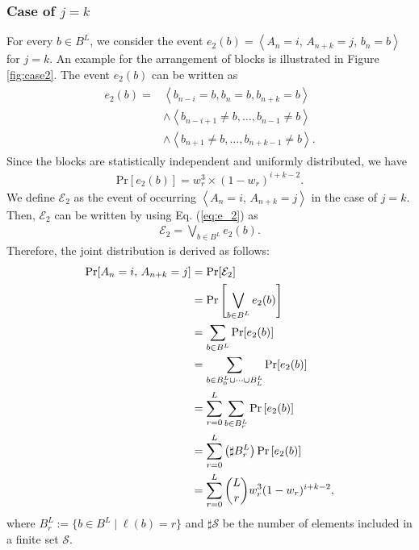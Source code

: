 \documentclass[dvipdfmx,english]{ampmt} %
\begin{document}
\subsubsection{Case of $j=k$}
For every $b \in B^{L}$, we consider the event $e_2(b)=\left< A_n=i ,\, A_{n+k}=j,\,b_n=b\right>$ for $j=k$. 
An example for the arrangement of blocks is illustrated in Figure \ref{fig:case2}.
The event $e_2(b)$ can be written as
\begin{align}\label{eq:e_2}
\begin{split}
  e_2(b) 
    = &\left< b_{n-i} = b , b_{n} = b, b_{n+k} = b \right> \\
    &\land \left< b_{n-i+1} \neq b , \dots , b_{n-1} \neq b \right> \\
    &\land \left< b_{n+1} \neq b , \dots , b_{n+k-1} \neq b \right>.
\end{split}
\end{align}
Since the blocks are statistically independent and uniformly distributed, we have
\begin{align}\label{eq:probability_e_2}
  \mathrm{Pr} \left[ e_2(b) \right] 
  =w_r^3 \times (1-w_{r})^{i+k-2}.
\end{align}
%
We define $\mathcal{E}_2$ as the event of occurring $\left< A_n=i ,\, A_{n+k}=j\right>$ in the case of $j=k$. Then, $\mathcal{E}_2$ can be written by using Eq. (\ref{eq:e_2}) as
\begin{align}\label{eq:E_2}
  \mathcal{E}_2 = \bigvee_{b\in B^L} e_2(b).
\end{align}
%
Therefore, the joint distribution is derived as follows:
\begin{align}
\begin{split}\label{eq:joint_dist_2}
  \mathrm{Pr}[A_n=i ,\, A_{n+k}=j] &=
  \mathrm{Pr}[\mathcal{E}_2] \\
  &=\mathrm{Pr}\left[ \bigvee_{b \in B^L} e_2(b) \right] \\
  &= \sum_{b\in B^L} \mathrm{Pr} [e_2(b)] \\
  &= \sum_{b\in B_0^L \cup \dots \cup B_L^L} \mathrm{Pr} [e_2(b)] \\
  &= \sum_{r=0}^{L} \sum_{b\in B_{r}^L} \mathrm{Pr} \left[ e_2(b) \right] \\
  &= \sum_{r=0}^{L} \left(\sharp B_{r}^L \right) \mathrm{Pr} \left[ e_2(b) \right] \\
  &= \sum_{r=0}^{L} \dbinom{L}{r} w_{r}^3 (1-w_{r})^{i+k-2},
\end{split}
\end{align}
where $B_r^L := \{ b\in B^L \mid \ell(b)=r \}$ and $\sharp \mathcal{S}$ be the number of elements included in a finite set $\mathcal{S}$.
\end{document}
